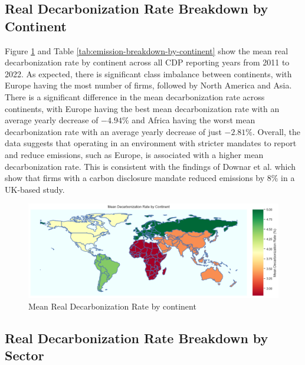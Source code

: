 \subsection{Real Decarbonization Rate Breakdown by Continent}
Figure \ref{fig:emission-breakdown-by-continent} and Table \ref{tab:emission-breakdown-by-continent} show the mean real decarbonization rate by continent across all CDP reporting years from 2011 to 2022. As expected, there is significant class imbalance between continents, with Europe having the most number of firms, followed by North America and Asia. There is a significant difference in the mean decarbonization rate across continents, with Europe having the best mean decarbonization rate with an average yearly decrease of $-4.94 \%$ and Africa having the worst mean decarbonization rate with an average yearly decrease of just $-2.81 \%$. Overall, the data suggests that operating in an environment with stricter mandates to report and reduce emissions, such as Europe, is associated with a higher mean decarbonization rate. This is consistent with the findings of Downar et al. \cite{Downar2020The} which show that firms with a carbon disclosure mandate reduced emissions by $8\%$ in a UK-based study.

\noindent 

\begin{figure}[H]
    \begin{center}
    \includegraphics[width=5in]{figures/mean_decarbonization_rate_by_continent.png}
    \caption{Mean Real Decarbonization Rate by continent}
    \label{fig:emission-breakdown-by-continent}
    \end{center}
\end{figure}
  




\subsection{Real Decarbonization Rate Breakdown by Sector}

